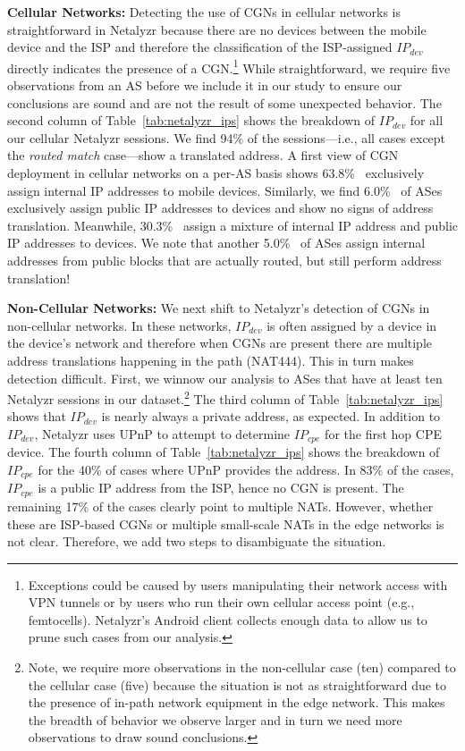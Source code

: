 \documentclass[10pt]{sig-alternate-05-2015}
\newcommand{\neta}{Netalyzr\xspace}
\newcommand{\parax}[1]{\vspace{0.2em} \noindent \textbf{#1:}}
\providecommand{\eg}{{e.g.}, }
\begin{document}
\parax{Cellular Networks}
Detecting the use of CGNs in cellular networks is straightforward in
\neta because there are no devices between the mobile device and the
ISP and therefore the classification of the ISP-assigned $IP_{dev}$
directly indicates the presence of a CGN.\footnote{Exceptions could
  be caused by users manipulating their network access with VPN
  tunnels or by users who run their own cellular access point (\eg
  femtocells). \neta's Android client collects enough data to allow
  us to prune such cases from our analysis.}  While straightforward,
we require five observations from an AS before we include it in our
study to ensure our conclusions are sound and are not the result of
some unexpected behavior.  The second column of
Table~\ref{tab:netalyzr_ips} shows the breakdown of $IP_{dev}$ for
all our cellular \neta sessions.  We find 94\% of the
sessions---i.e., all cases except the \textit{routed match}
case---show a translated address.
A first view of CGN deployment in cellular networks on a per-AS
basis shows 63.8\%~ exclusively
assign internal IP addresses to mobile devices.  Similarly, we find
6.0\%~ of ASes exclusively assign 
public IP addresses to devices and show no signs of address
translation.  Meanwhile,
30.3\%~ assign a mixture of
internal IP address and public IP addresses to devices. We note that
another 5.0\%~ of ASes assign
internal addresses from public blocks that are actually routed, but
still perform address translation!



\parax{Non-Cellular Networks}
We next shift to \neta's detection of CGNs in non-cellular networks.
In these networks, $IP_{dev}$ is often assigned by a device in the
device's network and therefore when CGNs are present there are
multiple address translations happening in the path (NAT444).  This in turn
makes detection difficult.  First, we winnow our analysis to ASes
that have at least ten \neta sessions in our dataset.\footnote{Note,
  we require more observations in the non-cellular case (ten)
  compared to the cellular case (five) because the situation is not
  as straightforward due to the presence of in-path network
  equipment in the edge network.  This makes the breadth of behavior
  we observe larger and in turn we need more observations to draw
  sound conclusions.} The third column of
Table~\ref{tab:netalyzr_ips} shows that $IP_{dev}$ is nearly always a
private address, as expected.  In addition to $IP_{dev}$, \neta uses
UPnP \cite{rfc6970} to attempt to determine $IP_{cpe}$ for the first
hop CPE device.
The fourth column of Table~\ref{tab:netalyzr_ips}
shows the breakdown of $IP_{cpe}$ for the 40\% of cases where UPnP
provides the address.  In 83\% of the cases, $IP_{cpe}$ is a public
IP address from the ISP, hence no CGN is present.  The remaining
17\% of the cases clearly point to multiple NATs.  However, whether
these are ISP-based CGNs or multiple small-scale NATs in the edge
networks is not clear.  Therefore, we add two steps to disambiguate
the situation.
\end{document}
